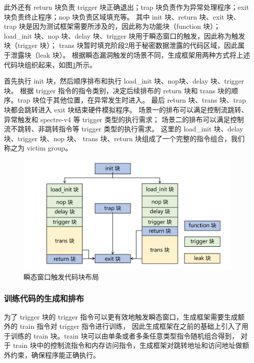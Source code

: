 此外还有 return 块负责 trigger 块正确退出；trap 块负责作为异常处理程序；exit 块负责终止程序；nop 块负责区域填充等。
其中 init 块、return 块、exit 块、trap 块是因为测试框架需要所涉及的，因此称为功能块（function 块）；
load\_init 块、nop 块、delay 块、trigger 块用于瞬态窗口的触发，因此称为触发块（trigger 块）；
trans 块暂时填充阶段2用于秘密数据泄露的代码区域，因此属于泄露块（leak 块）。
根据瞬态漏洞触发的场景不同，生成框架用两种方式将上述代码块组织起来，如图\ref{paper:trigger-dist}所示。\par

首先执行 init 块，然后顺序排布和执行 load\_init 块、nop块、delay 块、trigger 块。
根据 trigger 指令的指令类别，决定后续排布的 return 块和 trans 块的顺序。trap 块位于其他位置，在异常发生时进入。
最后 return 块、trans 块、trap 块都会跳转进入 exit 块结束硬件模拟程序。
场景一的排布可以满足控制流跳转、异常触发和 spectre-v4 等 trigger 类型的执行需求；
场景二的排布可以满足控制流不跳转、非跳转指令等 trigger 类型的执行需求。
这里的 load\_init 块、delay 块、trigger 块、nop 块、
trans 块、return 块组成了一个完整的指令组合，我们称之为 victim group。\par

\begin{figure}[!h]
    \centering
    \includegraphics[width=0.8\linewidth]{figure/paper/arrange-stage1.png}
    \caption{瞬态窗口触发代码块布局}
    \label{paper:trigger-dist}
\end{figure}

\subsubsection{训练代码的生成和排布}

为了 trigger 块的 trigger 指令可以更有效地触发瞬态窗口，生成框架需要生成额外的 train 指令对 trigger 指令进行训练，
因此生成框架在之前的基础上引入了用于训练的 train 块。train 块可以由单条或者多条任意类型指令随机组合得到，
对于 train 块中的控制流指令和内存访问指令，生成框架对跳转地址和访问地址做额外约束，确保程序能正确执行。\par

